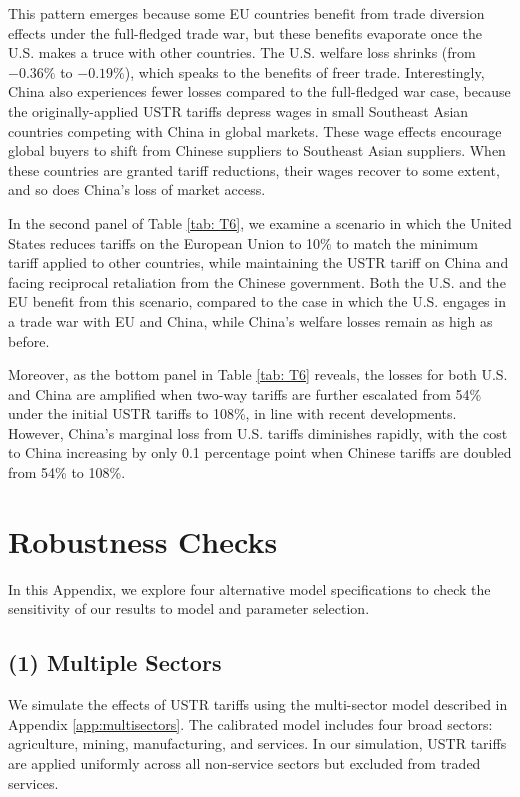 \documentclass[12pt]{article}
\begin{document}
This pattern emerges because some EU countries benefit from trade diversion effects under the full-fledged trade war, but these benefits evaporate once the U.S. makes a truce with other countries. The U.S. welfare loss shrinks (from $-0.36\%$ to $-0.19\%$), which speaks to the benefits of freer trade. Interestingly, China also experiences fewer losses compared to the full-fledged war case, because the originally-applied USTR tariffs depress wages in small Southeast Asian countries competing with China in global markets. These wage effects encourage global buyers to shift from Chinese suppliers to Southeast Asian suppliers. When these countries are granted tariff reductions, their wages recover to some extent, and so does China's loss of market access. 

In the second panel of Table \ref{tab: T6}, we examine a scenario in which the United States reduces tariffs on the European Union to 10\% to match the minimum tariff applied to other countries, while maintaining the USTR tariff on China and facing reciprocal retaliation from the Chinese government. Both the U.S. and the EU benefit from this scenario, compared to the case in which the U.S. engages in a trade war with EU and China, while China's welfare losses remain as high as before.

Moreover, as the bottom panel in Table \ref{tab: T6} reveals, the losses for both U.S. and China are amplified when two-way tariffs are further escalated from 54\% under the initial USTR tariffs to 108\%, in line with recent developments.  However, China's marginal loss from U.S. tariffs diminishes rapidly, with the cost to China increasing by only 0.1 percentage point when Chinese tariffs are doubled from 54\% to 108\%. 

\section{Robustness Checks\label{section: alt models}}
In this Appendix, we explore four alternative model specifications to check the sensitivity of our results to model and parameter selection. 
\subsection*{(1) Multiple Sectors}
We simulate the effects of USTR tariffs using the multi-sector model described in Appendix \ref{app:multisectors}. The calibrated model includes four broad sectors: agriculture, mining, manufacturing, and services. In our simulation, USTR tariffs are applied uniformly across all non-service sectors but excluded from traded services. 
\end{document}
